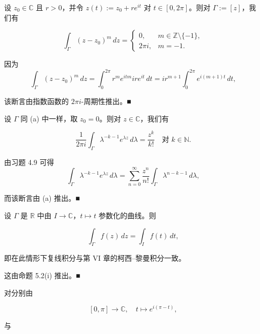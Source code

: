 \begin{example}

\begin{items}
\item

设 $ z_{0} \in \mathbb{C} $ 且 $ r > 0 $，并令 $ z(t) := z_{0} + re^{it} $ 对 $ t \in [0,2\pi] $。则对 $ \Gamma := [z] $，我们有

\begin{equation*}
\int_{\Gamma}(z - z_{0})^{m}\,dz = \begin{cases} 0 , & m \in \mathbb{Z}\setminus\{-1\} , \\ 2\pi i , & m = -1 . \end{cases}
\end{equation*}

\proofhead
因为
\[
\int_{\Gamma}(z - z_{0})^{m}\,dz = \int_{0}^{2\pi}r^{m}e^{itm}ire^{it}\,dt = ir^{m+1}\int_{0}^{2\pi}e^{i(m+1)t}\,dt ,
\]

该断言由指数函数的 $ 2\pi i $-周期性推出。\nobreak\hspace{0.35em}■

\item

设 $ \Gamma $ 同 (a) 中一样，取 $ z_{0} = 0 $。则对 $ z \in \mathbb{C} $，我们有

\[
\frac{1}{2\pi i}\int_{\Gamma}\lambda^{-k-1}e^{\lambda z}\,d\lambda = \frac{z^{k}}{k!} \quad \text{对 } k \in \mathbb{N} .
\]

\proofhead
由习题 4.9 可得
\[
\int_{\Gamma}\lambda^{-k-1}e^{\lambda z}\,d\lambda = \sum_{n=0}^{\infty}\frac{z^{n}}{n!}\int_{\Gamma}\lambda^{n-k-1}\,d\lambda ,
\]

而该断言由 (a) 推出。\nobreak\hspace{0.35em}■

\item

设 $ \Gamma $ 是 $ \mathbb{R} $ 中由 $ I \to \mathbb{C} $，$ t \mapsto t $ 参数化的曲线。则

\[
\int_{\Gamma}f(z)\,dz = \int_{I}f(t)\,dt ,
\]

即在此情形下复线积分与第 VI 章的柯西–黎曼积分一致。

\proofhead
这由命题 5.2(i) 推出。\nobreak\hspace{0.35em}■
\item

对分别由

\[
[0,\pi] \to \mathbb{C} , \quad t \mapsto e^{i(\pi - t)} ,
\]

与


\end{items}
\end{example}

